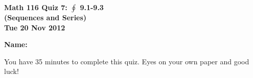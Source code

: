 \documentclass[11pt,letterpaper]{article}
\begin{document}
\flushleft
\begin{multicols}{2}

\begin{large}\textbf{Math 116 Quiz 7: $\oint$ 9.1-9.3 \\ (Sequences and Series) \\
Tue 20 Nov 2012}\end{large}

\textbf{Name:  }\underline{\hspace{4pc}{\bf SOLUTIONS}\hspace{4pc}}

\vspace{.5in}

\end{multicols}

\pagestyle{empty}

\flushleft

You have 35 minutes to complete this quiz.  Eyes on your own paper and good luck!
\end{document}
